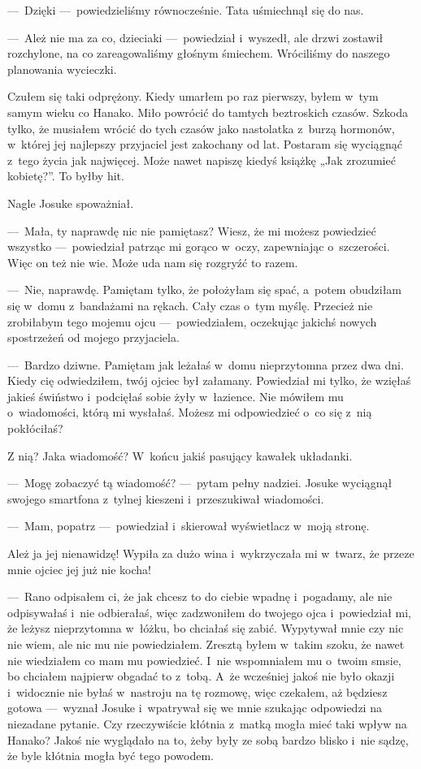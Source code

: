 ---~Dzięki ---~powiedzieliśmy równocześnie. Tata uśmiechnął się do nas. 

---~Ależ nie ma za co, dzieciaki ---~powiedział i~wyszedł, ale drzwi zostawił rozchylone, na co zareagowaliśmy głośnym śmiechem. Wróciliśmy do naszego planowania wycieczki.

Czułem się taki odprężony. Kiedy umarłem po raz pierwszy, byłem w~tym samym wieku co Hanako. Miło powrócić do tamtych beztroskich czasów. Szkoda tylko, że musiałem wrócić do tych czasów jako nastolatka z~burzą hormonów, w~której jej najlepszy przyjaciel jest zakochany od lat. Postaram się wyciągnąć z~tego życia jak najwięcej. Może nawet napiszę kiedyś książkę „Jak zrozumieć kobietę?”. To byłby hit. 

Nagle Josuke spoważniał. 

---~Mała, ty naprawdę nic nie pamiętasz? Wiesz, że mi możesz powiedzieć wszystko ---~powiedział patrząc mi gorąco w~oczy, zapewniając o~szczerości. Więc on też nie wie. Może uda nam się rozgryźć to razem.

---~Nie, naprawdę. Pamiętam tylko, że położyłam się spać, a~potem obudziłam się w~domu z~bandażami na rękach. Cały czas o~tym myślę. Przecież nie zrobiłabym tego mojemu ojcu ---~powiedziałem, oczekując jakichś nowych spostrzeżeń od mojego przyjaciela.

---~Bardzo dziwne. Pamiętam jak leżałaś w~domu nieprzytomna przez dwa dni. Kiedy cię odwiedziłem, twój ojciec był załamany. Powiedział mi tylko, że wzięłaś jakieś świństwo i~podcięłaś sobie żyły w~łazience. Nie mówiłem mu o~wiadomości, którą mi wysłałaś. Możesz mi odpowiedzieć o~co się z~nią pokłóciłaś?

Z nią? Jaka wiadomość? W~końcu jakiś pasujący kawałek układanki. 

---~Mogę zobaczyć tą wiadomość? ---~pytam pełny nadziei. Josuke wyciągnął swojego smartfona z~tylnej kieszeni i~przeszukiwał wiadomości.

---~Mam, popatrz ---~powiedział i~skierował wyświetlacz w~moją stronę.

\begin{sms}
Ależ ja jej nienawidzę! Wypiła za dużo wina i~wykrzyczała mi w~twarz, że przeze mnie ojciec jej już nie kocha!
\end{sms}

---~Rano odpisałem ci, że jak chcesz to do ciebie wpadnę i~pogadamy, ale nie odpisywałaś i~nie odbierałaś, więc zadzwoniłem do twojego ojca i~powiedział mi, że leżysz nieprzytomna w~łóżku, bo chciałaś się zabić. Wypytywał mnie czy nic nie wiem, ale nic mu nie powiedziałem. Zresztą byłem w~takim szoku, że nawet nie wiedziałem co mam mu powiedzieć. I~nie wspomniałem mu o~twoim smsie, bo chciałem najpierw obgadać to z~tobą. A~że wcześniej jakoś nie było okazji i~widocznie nie byłaś w~nastroju na tę rozmowę, więc czekałem, aż będziesz gotowa ---~wyznał Josuke i~wpatrywał się we mnie szukając odpowiedzi na niezadane pytanie. Czy rzeczywiście kłótnia z~matką mogła mieć taki wpływ na Hanako? Jakoś nie wyglądało na to, żeby były ze sobą bardzo blisko i~nie sądzę, że byle kłótnia mogła być tego powodem. 

